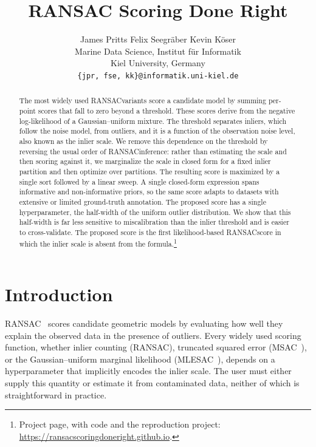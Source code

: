 \documentclass{article}
\title{RANSAC Scoring Done Right}
\author{%
  James Pritts \quad Felix Seegräber \quad Kevin Köser \\
  Marine Data Science, Institut für Informatik \\
  Kiel University, Germany \\
  \texttt{\{jpr, fse, kk\}@informatik.uni-kiel.de} \\
}
\newcommand{\mname}[1]{\texorpdfstring{#1\xspace}{#1}}
\newcommand{\ransac}{\mname{RANSAC}}
\newcommand{\msac}{\mname{MSAC}}
\newcommand{\mlesac}{\mname{MLESAC}}
\newcommand{\gaussunif}{Gaussian--uniform\xspace}
\begin{document}
\maketitle

\begin{abstract}
	The most widely used \ransac variants score a candidate model by
	summing per-point scores that fall to zero beyond a threshold.
	These scores derive from the negative log-likelihood of a
	\gaussunif mixture. The threshold separates inliers, which
	follow the noise model, from outliers, and it is a function of the
	observation noise level, also known as the inlier scale. We remove
	this dependence on the threshold by reversing the usual order of
	\ransac inference: rather than estimating the scale and then
	scoring against it, we marginalize the scale in closed form for a
	fixed inlier partition and then optimize over partitions. The
	resulting score is maximized by a single sort followed by a linear
	sweep. A single closed-form expression spans informative and
	non-informative priors, so the same score adapts to datasets with
	extensive or limited ground-truth annotation. The proposed score
	has a single hyperparameter, the half-width of the uniform outlier
	distribution. We show that this half-width is far less sensitive
	to miscalibration than the inlier threshold and is easier to
	cross-validate. The proposed score is the first likelihood-based
	\ransac score in which the inlier scale is absent from the
	formula.\footnote{Project page, with code and the reproduction
		project: \url{https://ransacscoringdoneright.github.io}.}
\end{abstract}

\section{Introduction}
\label{sec:intro}

\ransac~\cite{Fischler1981} scores candidate geometric models by
evaluating how well they explain the observed data in the presence
of outliers.  Every widely used scoring function, whether inlier
counting (\ransac), truncated squared error (\msac~\cite{Torr1998}),
or the \gaussunif marginal likelihood
(\mlesac~\cite{Torr2000}), depends on a hyperparameter that
implicitly encodes the inlier scale.  The user
must either supply this quantity or estimate it from
contaminated data, neither of which is straightforward in
practice.
\end{document}
